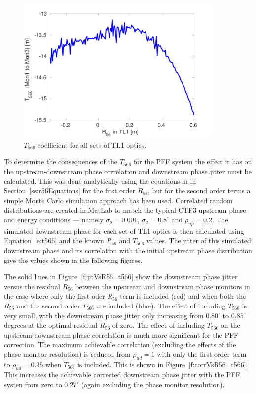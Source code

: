 \begin{figure}
  \centering
  \includegraphics[width=0.9\textwidth]{Figures/propagation/t566TotVsr56TL1}
  \caption{\(T_{566}\) coefficient for all sets of TL1 optics.}
  \label{f:t566TotVsr56TL1}
\end{figure}

To determine the consequences of the \(T_{566}\) for the PFF system the effect it has on the upstream-downstream phase correlation and downstream phase jitter must be calculated. This was done analytically using the equations in in Section~\ref{ss:r56Equations} for the first order \(R_{56}\), but for the second order terms a simple Monte Carlo simulation approach has been used. Correlated random distributions are created in MatLab to match the typical CTF3 upstream phase and energy conditions --- namely \(\sigma_p = 0.001\), \(\sigma_u = 0.8^\circ\) and \(\rho_{up} = 0.2\). The simulated downstream phase for each set of TL1 optics is then calculated using Equation~\ref{e:t566} and the known \(R_{56}\) and \(T_{566}\) values. The jitter of this simulated downstream phase and its correlation with the initial upstream phase distribution give the values shown in the following figures.

The solid lines in Figure~\ref{f:jitVsR56_t566} show the downstream phase jitter versus the residual \(R_{56}\) between the upstream and downstream phase monitors in the case where only the first oder \(R_{56}\) term is included (red) and when both the \(R_{56}\) and the second order \(T_{566}\) are included (blue). The effect of including \(T_{566}\) is very small, with the downstream phase jitter only increasing from \(0.80^\circ\) to \(0.85^\circ\) degrees at the optimal residual \(R_{56}\) of zero. The effect of including \(T_{566}\) on the upstream-downstream phase correlation is much more significant for the PFF correction. The maximum achievable correlation (excluding the effects of the phase monitor resolution) is reduced from \(\rho_{ud} = 1\) with only the first order term to \(\rho_{ud} = 0.95\) when \(T_{566}\) is included. This is shown in Figure~\ref{f:corrVsR56_t566}.  This increases the achievable corrected downstream phase jitter with the PFF systen from zero to \(0.27^\circ\) (again excluding the phase monitor resolution). 

